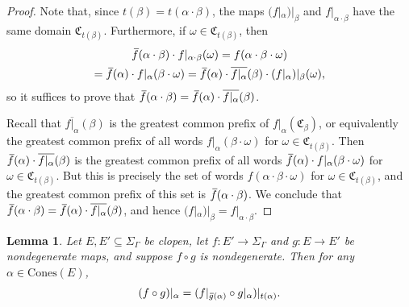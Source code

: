 \documentclass[11pt,letterpaper]{amsart}
\newtheorem{lemma}[theorem]{Lemma}
\theoremstyle{definition}
\newcommand{\C}{\mathfrak{C}}
\newcommand{\Cones}{\mathrm{Cones}}
\newcommand{\of}{\mkern 3.5mu\overline{\mkern-3.5mu f\mkern0.75mu}\mkern-0.75mu}
\newcommand{\og}{\mkern 2mu\overline{\mkern-2mu g\mkern0.5mu}\mkern-0.5mu}
\begin{document}
\begin{proof}
Note that, since $t(\beta)=t(\alpha\cdot\beta)$, the maps $(f|_\alpha)|_\beta$ and $f|_{\alpha\cdot\beta}$ have the same domain $\C_{t(\beta)}$.  Furthermore, if $\omega\in \C_{t(\beta)}$, then
\begin{multline*}
\of(\alpha\cdot\beta)\cdot f|_{\alpha\cdot\beta}(\omega)
=
f(\alpha\cdot\beta\cdot\omega)
\\
=
\of(\alpha)\cdot f|_\alpha(\beta\cdot\omega)
=
\of(\alpha)\cdot \overline{f|_\alpha}(\beta)\cdot (f|_\alpha)|_\beta(\omega)\text{,}
\end{multline*}
so it suffices to prove that $\of(\alpha\cdot\beta)=\of(\alpha)\cdot \overline{f|_\alpha}(\beta)$.

Recall that $\overline{f|_\alpha}(\beta)$ is the greatest common prefix of $f|_\alpha(\C_\beta)$, or equivalently the greatest common prefix of all words $f|_\alpha(\beta\cdot \omega)$ for $\omega \in \C_{t(\beta)}$.  Then $\of(\alpha)\cdot \overline{f|_\alpha}(\beta)$ is the greatest common prefix of all words $\of(\alpha)\cdot f|_\alpha(\beta\cdot\omega)$ for $\omega\in \C_{t(\beta)}$.  But this is  precisely the set of words $f(\alpha\cdot\beta\cdot\omega)$ for $\omega\in \C_{t(\beta)}$, and the greatest common prefix of this set is $\of(\alpha\cdot\beta)$.  We conclude that $\of(\alpha\cdot\beta)=\of(\alpha)\cdot\overline{f|_\alpha}(\beta)$, and hence $(f|_\alpha)|_\beta = f|_{\alpha\cdot\beta}$.
\end{proof}

\begin{lemma}\label{lem:restrict_composition}
Let $E,E'\subseteq \Sigma_\Gamma$ be clopen, let $f\colon E'\to \Sigma_{\Gamma}$ and $g\colon E\to E'$ be nondegenerate maps, and suppose $f\circ g$ is nondegenerate. Then for any $\alpha\in\Cones(E)$,
\[
(f\circ g)|_\alpha = (f|_{\og(\alpha)} \circ g|_\alpha)|_{t(\alpha)}.
\]
\end{lemma}
\end{document}
